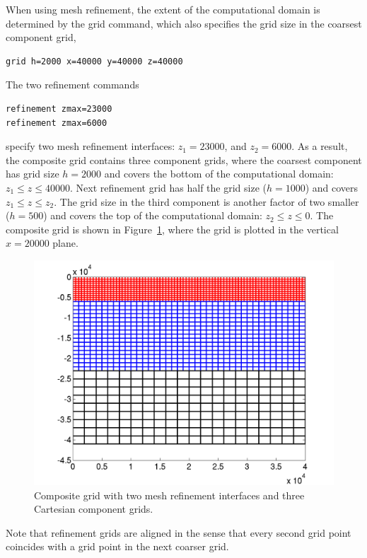 \documentclass[11pt]{report}
\begin{document}
When using mesh refinement, the extent of the computational domain is determined by the grid command,
which also specifies the grid size in the coarsest component grid,
\begin{verbatim}
grid h=2000 x=40000 y=40000 z=40000
\end{verbatim}
The two refinement commands
\begin{verbatim}
refinement zmax=23000
refinement zmax=6000
\end{verbatim}
specify two mesh refinement interfaces: $z_1=23000$, and $z_2=6000$. As a result, the composite grid
contains three component grids, where the coarsest component has grid size $h=2000$ and covers the
bottom of the computational domain: $z_1\leq z\leq 40000$. Next refinement grid has half the grid
size ($h=1000$) and covers $z_1\leq z\leq z_2$. The grid size in the third component is another
factor of two smaller ($h=500$) and covers the top of the computational domain: $z_2\leq z\leq
0$. The composite grid is shown in Figure~\ref{fig:gridrefs1}, where the grid is plotted in the
vertical $x=20000$ plane.
%
\begin{figure}
\begin{centering}
  \includegraphics[width=0.7\linewidth]{figures/comp-grid-2.png}
  \caption{Composite grid with two mesh refinement interfaces and three Cartesian component grids.}
  \label{fig:gridrefs1}
\end{centering}
\end{figure}  
Note that refinement grids are aligned in the sense that every second grid point coincides with a grid point in
the next coarser grid.
\end{document}
